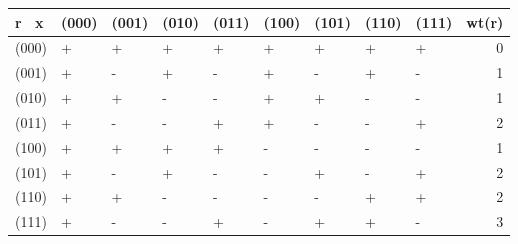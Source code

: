 \begin{tabular}{lllllllllr}
\toprule
r \ x & (000) & (001) & (010) & (011) & (100) & (101) & (110) & (111) & wt(r) \\
\midrule
(000) & + & + & + & + & + & + & + & + & 0 \\
(001) & + & - & + & - & + & - & + & - & 1 \\
(010) & + & + & - & - & + & + & - & - & 1 \\
(011) & + & - & - & + & + & - & - & + & 2 \\
(100) & + & + & + & + & - & - & - & - & 1 \\
(101) & + & - & + & - & - & + & - & + & 2 \\
(110) & + & + & - & - & - & - & + & + & 2 \\
(111) & + & - & - & + & - & + & + & - & 3 \\
\bottomrule
\end{tabular}
